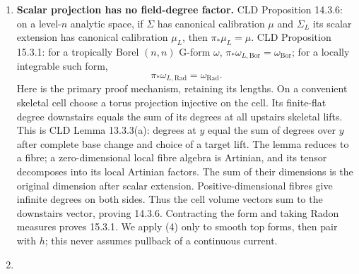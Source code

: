 \documentclass[
  10pt,
]{article}
\begin{document}
\begin{enumerate}
  locally integrable on the calibrated tropical polyhedron, and then
  \(f_*((f^*a)_{\mathrm{Rad}})=\langle a,\mu_{\Pi_f}\rangle_{\mathrm{Rad}}\);
  the corresponding integrals agree. In particular a smooth top form is
  finite on a compact moment domain. Lower-dimensional cells have no top
  measure. Compact moment images are finite polyhedra by the
  polyhedrality assertion of CLD Theorem 12.2.4. The dimension bound is
  specifically CLD 12.2.10(1)--(2):
  \(\dim_{\mathrm{trop},x}f\le d_K(x)\le\dim_xX\) and, for compact
  \(X\), \(\dim f_{\mathrm{trop}}(X)=\sup_x\dim_{\mathrm{trop},x}f\).
  Thus compact curve images have dimension at most one. We do not use a
  claim that a moment image always has dimension equal to its source;
  constant moments rule out that reading. CLD 7.3.5 defines integration
  currents for locally integrable multipliers; a continuous finite
  multiplier is locally integrable. T8 proves the carrier
  total-variation estimate needed here, before any possibly cancelling
  signed pushforward.
\item
  \textbf{Scalar projection has no field-degree factor.} CLD Proposition
  14.3.6: on a level-\(n\) analytic space, if \(\Sigma\) has canonical
  calibration \(\mu\) and \(\Sigma_L\) its scalar extension has
  canonical calibration \(\mu_L\), then \(\pi_*\mu_L=\mu\). CLD
  Proposition 15.3.1: for a tropically Borel \((n,n)\) G-form
  \(\omega\), \(\pi_*\omega_{L,\mathrm{Bor}}=\omega_{\mathrm{Bor}}\);
  for a locally integrable such form, \[
             \pi_*\omega_{L,\mathrm{Rad}}
                       =\omega_{\mathrm{Rad}}.          \tag{4}
  \] Here is the primary proof mechanism, retaining its lengths. On a
  convenient skeletal cell choose a torus projection injective on the
  cell. Its finite-flat degree downstairs equals the sum of its degrees
  at all upstairs skeletal lifts. This is CLD Lemma 13.3.3(a): degrees
  at \(y\) equal the sum of degrees over \(y\) after complete base
  change and choice of a target lift. The lemma reduces to a fibre; a
  zero-dimensional local fibre algebra is Artinian, and its tensor
  decomposes into its local Artinian factors. The sum of their
  dimensions is the original dimension after scalar extension.
  Positive-dimensional fibres give infinite degrees on both sides. Thus
  the cell volume vectors sum to the downstairs vector, proving 14.3.6.
  Contracting the form and taking Radon measures proves 15.3.1. We apply
  (4) only to smooth top forms, then pair with \(h\); this never assumes
  pullback of a continuous current.
\item

\end{enumerate}
\end{document}
